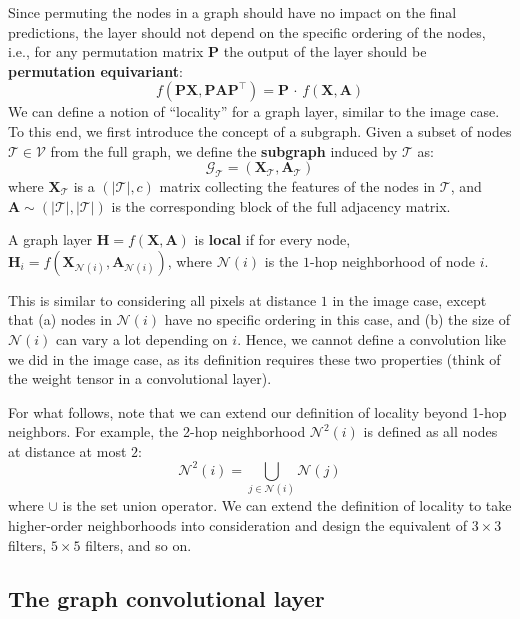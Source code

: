 Since permuting the nodes in a graph should have no impact on the final predictions, the layer should not depend on the specific ordering of the nodes, i.e., for any permutation matrix $\mathbf{P}$ the output of the layer should be \textbf{permutation equivariant}:
%
$$
f(\mathbf{P}\mathbf{X}, \mathbf{P}\mathbf{A}\mathbf{P}^\top)=\mathbf{P}\,\cdot\,f(\mathbf{X}, \mathbf{A})
$$
%
We can define a notion of “locality” for a graph layer, similar to the image case. To this end, we first introduce the concept of a subgraph. Given a subset of nodes $\mathcal{T} \in \mathcal{V}$ from the full graph, we define the \textbf{subgraph} induced by $\mathcal{T}$ as:
%
$$
\mathcal{G}_{\mathcal{T}}= (\mathbf{X}_{\mathcal{T}}, \mathbf{A}_{\mathcal{T}})
$$
%
where $\mathbf{X}_{\mathcal{T}}$ is a $(\lvert\mathcal{T}\rvert,c)$ matrix collecting the features of the nodes in $\mathcal{T}$, and $\mathbf{A} \sim (\lvert\mathcal{T}\rvert,\lvert\mathcal{T}\rvert)$ is the corresponding block of the full adjacency matrix.

\begin{definition}
A graph layer $\mathbf{H} =f(\mathbf{X}, \mathbf{A})$ is \textbf{local} if for every node, $\mathbf{H}_i = f(\mathbf{X}_{\mathcal{N}(i)}, \mathbf{A}_{\mathcal{N}(i)})$, where $\mathcal{N}(i)$ is the $1$-hop neighborhood of node $i$.
\end{definition}

This is similar to considering all pixels at distance $1$ in the image case, except that (a) nodes in $\mathcal{N}(i)$ have no specific ordering in this case, and (b) the size of $\mathcal{N}(i)$ can vary a lot depending on $i$. Hence, we cannot define a convolution like we did in the image case, as its definition requires these two properties (think of the weight tensor in a convolutional layer).

For what follows, note that we can extend our definition of locality beyond 1-hop neighbors. For example, the 2-hop neighborhood $\mathcal{N}^2(i)$ is defined as all nodes at distance at most $2$:
%
$$
\mathcal{N}^2(i) = \bigcup_{j \in \mathcal{N}(i)} \mathcal{N}(j) 
$$
%
where $\cup$ is the set union operator. We can extend the definition of locality to take higher-order neighborhoods into consideration and design the equivalent of $3 \times 3$ filters, $5 \times 5$ filters, and so on.

\subsection{The graph convolutional layer} \addclock

